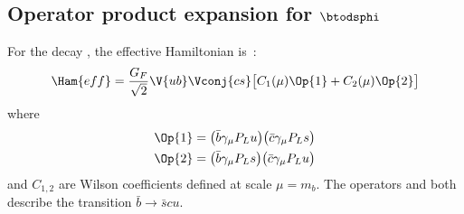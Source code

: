 \subsection[Operator product expansion for \btodsphi]
{Operator product expansion for $\boldsymbol{\btodsphi}$}

For the decay \btodsphi, the effective Hamiltonian
is~\cite{Zou:2009zza,Mohanta:2002wf,PhysRevD.76.057701,Lu:2001yz}:
\begin{equation}
  \Ham{eff}=
  \frac{G_F}{\sqrt{2}} \V{ub}\Vconj{cs}
  \big[
    C_1(\mu)\Op{1}+C_2(\mu)\Op{2}
    \big]
\end{equation}
where
\begin{align}
  \Op{1} &= \big(\bar b\gamma_\mu P_Lu\big) \big(\bar c\gamma_\mu P_Ls\big) \nonumber\\
  \Op{2} &= \big(\bar b\gamma_\mu P_Ls\big) \big(\bar c\gamma_\mu P_Lu\big)
\end{align}
and $C_{1,2}$ are Wilson coefficients defined at scale $\mu=m_b$.
The operators  and  both describe the transition $\bar b\!\to\bar scu$.


